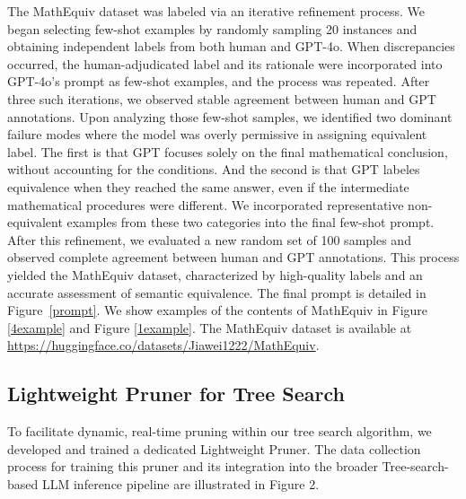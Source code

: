 \documentclass[11pt]{article}
\begin{document}
The MathEquiv dataset was labeled via an iterative refinement process. 
We began selecting few-shot examples by randomly sampling 20 instances and obtaining independent labels from both human and GPT-4o. When discrepancies occurred, the human-adjudicated label and its rationale were incorporated into GPT-4o's prompt as few-shot examples, and the process was repeated. 
After three such iterations, we observed stable agreement between human and GPT annotations. Upon analyzing those few-shot samples, we identified two dominant failure modes where the model was overly permissive in assigning equivalent label. The first is that GPT focuses solely on the final mathematical conclusion, without accounting for the conditions. And the second is that GPT labeles equivalence when they reached the same answer, even if the intermediate mathematical procedures were different.
We incorporated representative non-equivalent examples from these two categories into the final few-shot prompt. After this refinement, we evaluated a new random set of 100 samples and observed complete agreement between human and GPT annotations.
This process yielded the MathEquiv dataset, characterized by high-quality labels and an accurate assessment of semantic equivalence. The final prompt is detailed in Figure~\ref{prompt}. We show examples of the contents of MathEquiv in Figure \ref{4example} and Figure \ref{1example}. The MathEquiv dataset is available at \url{https://huggingface.co/datasets/Jiawei1222/MathEquiv}.

\subsection{Lightweight Pruner for Tree Search}
To facilitate dynamic, real-time pruning within our tree search algorithm, we developed and trained a dedicated Lightweight Pruner. The data collection process for training this pruner and its integration into the broader Tree-search-based LLM inference pipeline are illustrated in Figure 2.
\end{document}
